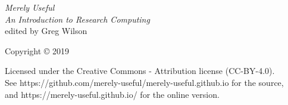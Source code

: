 {\Huge\itshape Merely Useful}\\[\baselineskip]

{\large\itshape
  An Introduction to Research Computing
}\\[0.2\textheight]

{\large edited by Greg Wilson}\par

\vfill

{\large Copyright {\copyright} 2019}

\vspace*{\baselineskip}


\vspace*{\baselineskip}

{\small
  Licensed under the Creative Commons - Attribution license (CC-BY-4.0).
  \\
  See https://github.com/merely-useful/merely-useful.github.io for the source,\\
  and https://merely-useful.github.io/ for the online version.
}
